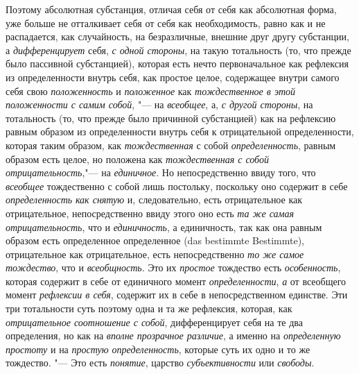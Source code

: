 Поэтому абсолютная субстанция, отличая себя от себя как абсолютная форма,
уже больше не отталкивает себя от себя как необходимость, равно как и не
распадается, как случайность, на безразличные, внешние друг другу
субстанции, а {\em дифференцирует} себя,
{\em с одной стороны}, на такую тотальность (то, что
прежде было пассивной субстанцией), которая есть нечто первоначальное как
рефлексия из определенности внутрь себя, как простое целое, содержащее
внутри самого себя свою {\em положенность} и
{\em положенное} как
{\em тождественное в этой положенности с самим собой},
"--- на {\em всеобщее}, а, {\em с
другой стороны}, на тотальность (то, что прежде было причинной субстанцией)
как на рефлексию равным образом из определенности внутрь себя к
отрицательной определенности, которая таким образом, как
{\em тождественная} с собой
{\em определенность}, равным образом есть целое, но
положена как {\em тождественная с собой
отрицательность},"--- на {\em единичное}. Но
непосредственно ввиду того, что {\em всеобщее}
тождественно с собой лишь постольку, поскольку оно содержит в себе
{\em определенность} {\em как
снятую} и, следовательно, есть отрицательное как отрицательное,
непосредственно ввиду этого оно есть {\em та же самая
отрицательность}, что и {\em единичность}, а
единичность, так как она равным образом есть определенное определенное (das
bestimmte Bestimmte), отрицательное как отрицательное, есть непосредственно
{\em то же самое тождество}, что и {\em всеобщность}. Это их
{\em простое} тождество есть {\em особенность}, которая содержит в себе от
единичного момент {\em определенности}, {\em а} от всеобщего момент
{\em рефлексии в себя}, содержит их в себе в
непосредственном единстве. Эти три тотальности суть поэтому одна и та же
рефлексия, которая, как {\em отрицательное соотношение
с собой}, дифференцирует себя на те два определения, но как на
{\em вполне прозрачное различие}, а именно на {\em определенную простоту} и на
{\em простую определенность}, которые суть их одно и то
же тождество. "--- Это есть {\em понятие}, царство
{\em субъективности} или {\em свободы}.


\bigskip

